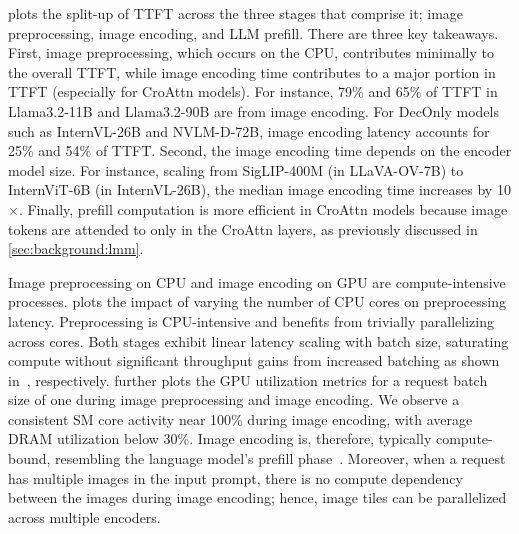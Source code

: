  plots the split-up of TTFT across the three stages that comprise it; image preprocessing, image encoding, and LLM prefill.
There are three key takeaways.
First, image preprocessing, which occurs on the CPU, contributes minimally to the overall TTFT, while image encoding time contributes to a major portion in TTFT (especially for CroAttn models).
For instance, 79\% and 65\% of TTFT in Llama3.2-11B and Llama3.2-90B are from image encoding.
For DecOnly models such as InternVL-26B and NVLM-D-72B, image encoding latency accounts for 25\% and 54\% of TTFT. Second, the image encoding time depends on the encoder model size. For instance, scaling from SigLIP-400M (in LLaVA-OV-7B) to InternViT-6B (in InternVL-26B), the median image encoding time increases by 10$\times$.
Finally, prefill computation is more efficient in CroAttn models because image tokens are attended to only in the CroAttn layers, as previously discussed in \cref{sec:background:lmm}.

\label{insight:1}

Image preprocessing on CPU and image encoding on GPU are compute-intensive processes.
 plots the impact of varying the number of CPU cores on preprocessing latency. Preprocessing is CPU-intensive and benefits from trivially parallelizing across cores.
Both stages exhibit linear latency scaling with batch size, saturating compute without significant throughput gains from increased batching as shown in~, respectively.
 further plots the GPU utilization metrics for a request batch size of one during image preprocessing and image encoding.
We observe a consistent SM core activity near 100\% during image encoding, with average DRAM utilization below 30\%.
Image encoding is, therefore, typically compute-bound, resembling the language model's prefill phase~\cite{pod-attention}.
Moreover, when a request has multiple images in the input prompt, there is no compute dependency between the images during image encoding; hence, image tiles can be parallelized across multiple encoders.

\label{insight:2}

